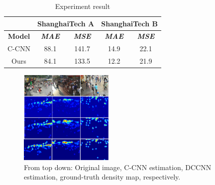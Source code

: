 




\begin{table}[htbp]
\caption{\label{tab:experiment-result}  Experiment result}
\begin{center}
\begin{tabular}{|c|c|c|c|c|}
\hline
\textbf{}&\multicolumn{2}{|c|}{\textbf{ShanghaiTech A}}&\multicolumn{2}{|c|}{\textbf{ShanghaiTech B}}\\
\hline
\textbf{Model} & \textbf{\textit{MAE}}& \textbf{\textit{MSE}} & \textbf{\textit{MAE}}& \textbf{\textit{MSE}} \\
\hline
C-CNN \cite{9053780} & 88.1 & 141.7  & 14.9 & 22.1   \\
\hline
Ours & 84.1 & 133.5 & 12.2 & 21.9  \\
\hline

\end{tabular}

\end{center}
\end{table}

\begin{figure}[htbp]
\centerline{\includegraphics[width=0.4\textwidth]{Picture/result/result_ccnn_vs_bigtail.png}}
\caption{From top down: Original image, C-CNN \cite{9053780} estimation, DCCNN estimation, ground-truth density map, respectively.}
\label{fig:result-picture}
\end{figure}





